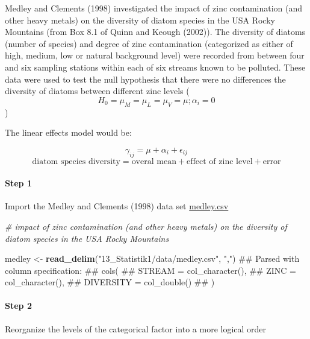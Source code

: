 \documentclass[]{book}
\newenvironment{Shaded}{\begin{snugshade}}{\end{snugshade}}
\newcommand{\KeywordTok}[1]{\textcolor[rgb]{0.13,0.29,0.53}{\textbf{#1}}}
\newcommand{\DataTypeTok}[1]{\textcolor[rgb]{0.13,0.29,0.53}{#1}}
\newcommand{\StringTok}[1]{\textcolor[rgb]{0.31,0.60,0.02}{#1}}
\newcommand{\CommentTok}[1]{\textcolor[rgb]{0.56,0.35,0.01}{\textit{#1}}}
\newcommand{\OperatorTok}[1]{\textcolor[rgb]{0.81,0.36,0.00}{\textbf{#1}}}
\newcommand{\NormalTok}[1]{#1}
\let\oldparagraph\paragraph
\renewcommand{\paragraph}[1]{\oldparagraph{#1}\mbox{}}
\begin{document}
Medley and Clements (1998) investigated the impact of zinc contamination
(and other heavy metals) on the diversity of diatom species in the USA
Rocky Mountains (from Box 8.1 of Quinn and Keough (2002)). The diversity
of diatoms (number of species) and degree of zinc contamination
(categorized as either of high, medium, low or natural background level)
were recorded from between four and six sampling stations within each of
six streams known to be polluted. These data were used to test the null
hypothesis that there were no differences the diversity of diatoms
between different zinc levels
(\[H_0 = \mu_M = \mu_L = \mu_V = \mu; \alpha_i = 0\])

The linear effects model would be:

\[\gamma_{ij} = \mu + \alpha_i + \epsilon_{ij}\]
\[\text{diatom species diversity} = \text{overal mean} + \text{effect of zinc level} + \text{error}\]

\paragraph{Step 1}\label{step-1}

Import the Medley and Clements (1998) data set
\href{13_Statistik1/data/medley.csv}{medley.csv}

\begin{Shaded}
\begin{Highlighting}[]

\CommentTok{# impact of zinc contamination (and other heavy metals) on the diversity of diatom species in the USA Rocky Mountains}

\NormalTok{medley <-}\StringTok{ }\KeywordTok{read_delim}\NormalTok{(}\StringTok{"13_Statistik1/data/medley.csv"}\NormalTok{, }\StringTok{","}\NormalTok{)}
\NormalTok{## Parsed with column specification:}
\NormalTok{## cols(}
\NormalTok{##   STREAM = col_character(),}
\NormalTok{##   ZINC = col_character(),}
\NormalTok{##   DIVERSITY = col_double()}
\NormalTok{## )}
\end{Highlighting}
\end{Shaded}

\paragraph{Step 2}\label{step-2}

Reorganize the levels of the categorical factor into a more logical
order

\begin{Shaded}
\end{Shaded}
\end{document}
